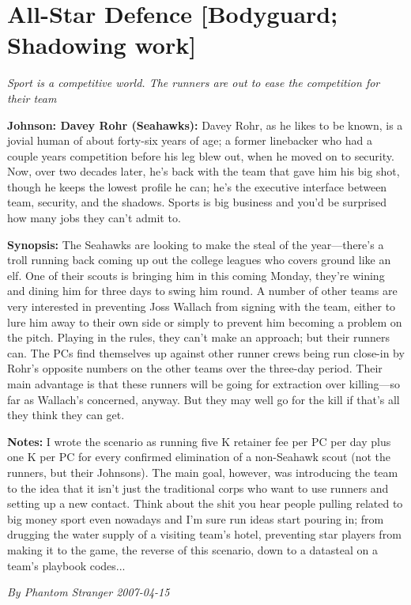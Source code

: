 \documentclass[letterpaper,twocolumn,10.5pt]{article}
\newenvironment{scenario}[6]
	{
		\section{#1 {\small[#2]}}
		\textit{#3}
		\def\TMPSCENARIO{#4 #5}
	}
	{\small\textit{By \TMPSCENARIO}}
\newcommand{\johnson}[2]{\textbf{Johnson: #1 (#2):}}
\newcommand{\synopsis}{\textbf{Synopsis: }}
\newcommand{\notes}{\textbf{Notes: }}
\begin{document}
\begin{scenario}{All-Star Defence}
	{Bodyguard; Shadowing work}
	{ Sport is a competitive world. The runners are out to ease the competition for their team}
	{Phantom Stranger}
	{2007-04-15}
	{https://forum.rpg.net/showthread.php?321504-Shadowrun-4th-101-Instant-Scenarios\&p=7171978#post7171978}

\johnson{Davey Rohr}{Seahawks} Davey Rohr, as he likes to be known, is a jovial human of about forty-six years of age; a former linebacker who had a couple years competition before his leg blew out, when he moved on to security. Now, over two decades later, he's back with the team that gave him his big shot, though he keeps the lowest profile he can; he's the executive interface between team, security, and the shadows. Sports is big business and you'd be surprised how many jobs they can't admit to.

\synopsis The Seahawks are looking to make the steal of the year---there's a troll running back coming up out the college leagues who covers ground like an elf. One of their scouts is bringing him in this coming Monday, they're wining and dining him for three days to swing him round. A number of other teams are very interested in preventing Joss Wallach from signing with the team, either to lure him away to their own side or simply to prevent him becoming a problem on the pitch. Playing in the rules, they can't make an approach; but their runners can. The PCs find themselves up against other runner crews being run close-in by Rohr's opposite numbers on the other teams over the three-day period. Their main advantage is that these runners will be going for extraction over killing---so far as Wallach's concerned, anyway. But they may well go for the kill if that's all they think they can get.

\notes I wrote the scenario as running five K retainer fee per PC per day plus one K per PC for every confirmed elimination of a non-Seahawk scout (not the runners, but their Johnsons). The main goal, however, was introducing the team to the idea that it isn't just the traditional corps who want to use runners and setting up a new contact. Think about the shit you hear people pulling related to big money sport even nowadays and I'm sure run ideas start pouring in; from drugging the water supply of a visiting team's hotel, preventing star players from making it to the game, the reverse of this scenario, down to a datasteal on a team's playbook codes... 

\end{scenario}
\end{document}
